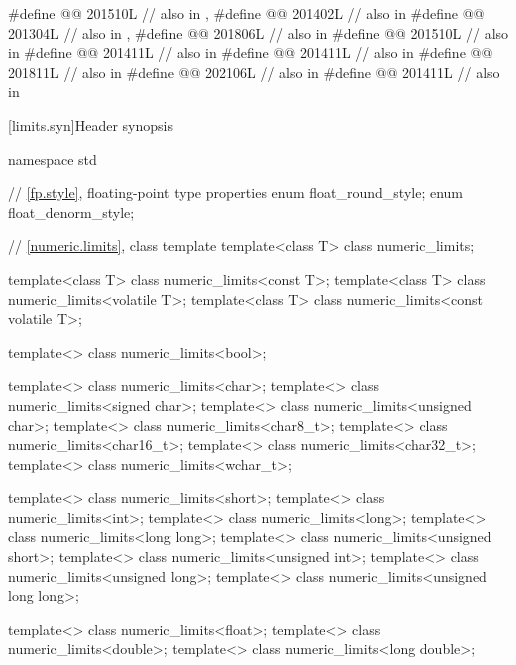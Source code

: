 \begin{codeblock}
#define @@             201510L // also in , 
#define @@                   201402L // also in 
#define @@                    201304L // also in , 
#define @@                     201806L // also in 
#define @@     201510L // also in 
#define @@               201411L // also in 
#define @@         201411L // also in 
#define @@                        201811L // also in 
#define @@                           202106L // also in 
#define @@                            201411L // also in 
\end{codeblock}

[limits.syn]{Header  synopsis}

%
%
%
%
%

\begin{codeblock}
namespace std {
  // \ref{fp.style}, floating-point type properties
  enum float_round_style;
  enum float_denorm_style;

  // \ref{numeric.limits}, class template 
  template<class T> class numeric_limits;

  template<class T> class numeric_limits<const T>;
  template<class T> class numeric_limits<volatile T>;
  template<class T> class numeric_limits<const volatile T>;

  template<> class numeric_limits<bool>;

  template<> class numeric_limits<char>;
  template<> class numeric_limits<signed char>;
  template<> class numeric_limits<unsigned char>;
  template<> class numeric_limits<char8_t>;
  template<> class numeric_limits<char16_t>;
  template<> class numeric_limits<char32_t>;
  template<> class numeric_limits<wchar_t>;

  template<> class numeric_limits<short>;
  template<> class numeric_limits<int>;
  template<> class numeric_limits<long>;
  template<> class numeric_limits<long long>;
  template<> class numeric_limits<unsigned short>;
  template<> class numeric_limits<unsigned int>;
  template<> class numeric_limits<unsigned long>;
  template<> class numeric_limits<unsigned long long>;

  template<> class numeric_limits<float>;
  template<> class numeric_limits<double>;
  template<> class numeric_limits<long double>;
}
\end{codeblock}

